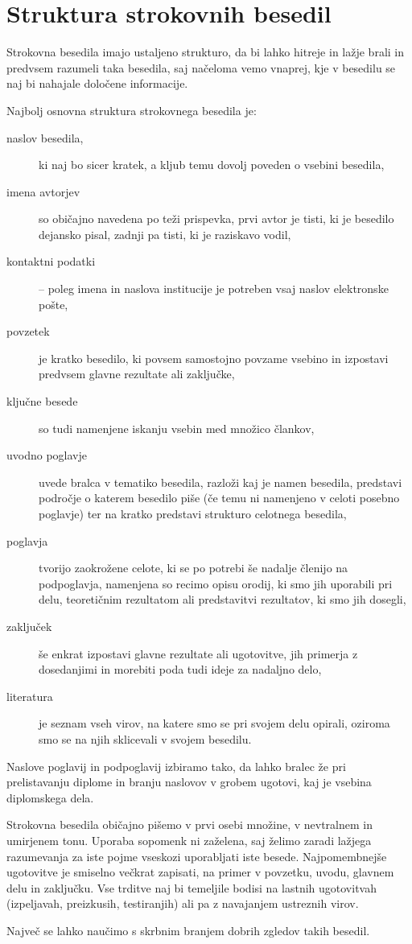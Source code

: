 \chapter{Struktura strokovnih besedil}
\label{stroka}

Strokovna besedila imajo ustaljeno strukturo, da bi lahko hitreje in lažje brali in predvsem
razumeli taka besedila, saj načeloma vemo vnaprej, kje v besedilu se naj bi nahajale določene
informacije.

Najbolj osnovna struktura strokovnega besedila je:
\begin{description}
    \item[naslov besedila,] ki naj bo sicer kratek, a kljub temu dovolj poveden o vsebini besedila,
    \item[imena avtorjev] so običajno navedena po teži prispevka, prvi avtor je tisti, ki je
        besedilo dejansko pisal, zadnji pa tisti, ki je raziskavo vodil,
    \item[kontaktni podatki] -- poleg imena in naslova institucije je potreben vsaj naslov
        elektronske pošte,
    \item[povzetek] je kratko besedilo, ki povsem samostojno povzame vsebino in izpostavi
        predvsem glavne rezultate ali zaključke,
    \item[ključne besede] so tudi namenjene iskanju vsebin med množico člankov,
    \item[uvodno poglavje] uvede bralca v tematiko besedila, razloži kaj je namen besedila,
        predstavi področje o katerem besedilo piše
        (če temu ni namenjeno v celoti posebno poglavje) ter na kratko predstavi strukturo
        celotnega besedila,
    \item[poglavja] tvorijo zaokrožene celote, ki se po potrebi še nadalje členijo na podpoglavja,
        namenjena so recimo opisu orodij, ki smo jih uporabili pri delu, teoretičnim rezultatom ali
        predstavitvi rezultatov, ki smo jih dosegli,
    \item[zaključek] še enkrat izpostavi glavne rezultate ali ugotovitve, jih primerja z
        dosedanjimi in morebiti poda tudi ideje za nadaljno delo,
    \item[literatura] je seznam vseh virov, na katere smo se pri svojem delu opirali, oziroma
        smo se na njih sklicevali v svojem besedilu.
\end{description}

Naslove poglavij in podpoglavij izbiramo tako, da lahko bralec že pri prelistavanju diplome in
branju naslovov v grobem ugotovi, kaj je vsebina diplomskega dela.

Strokovna besedila običajno pišemo v prvi osebi množine, v nevtralnem in umirjenem tonu.
Uporaba sopomenk ni zaželena, saj želimo zaradi lažjega razumevanja za iste pojme vseskozi
uporabljati iste besede.
Najpomembnejše ugotovitve je smiselno večkrat zapisati, na primer v povzetku, uvodu, glavnem
delu in zaključku.
Vse trditve naj bi temeljile bodisi na lastnih ugotovitvah (izpeljavah, preizkusih, testiranjih)
ali pa z navajanjem ustreznih virov.

Največ se lahko naučimo s skrbnim branjem dobrih zgledov takih besedil.

